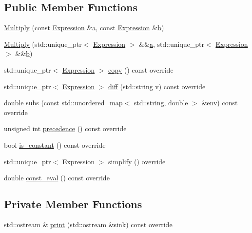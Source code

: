\subsection*{Public Member Functions}
\begin{DoxyCompactItemize}
\item 
\hyperlink{classsymcpp_1_1Multiply_abe8b88c2ac3ecd7deb275b1cb1f5dd9d}{Multiply} (const \hyperlink{classsymcpp_1_1Expression}{Expression} \&\hyperlink{classsymcpp_1_1Multiply_a8ed32ccb235cea51161dd0fd25ea130d}{a}, const \hyperlink{classsymcpp_1_1Expression}{Expression} \&\hyperlink{classsymcpp_1_1Multiply_a3d7a1b6e6e35585098b25f8b3a59e6ae}{b})
\item 
\hyperlink{classsymcpp_1_1Multiply_abefbdc2703e4c56207fe9aa987097fe6}{Multiply} (std\+::unique\+\_\+ptr$<$ \hyperlink{classsymcpp_1_1Expression}{Expression} $>$ \&\&\hyperlink{classsymcpp_1_1Multiply_a8ed32ccb235cea51161dd0fd25ea130d}{a}, std\+::unique\+\_\+ptr$<$ \hyperlink{classsymcpp_1_1Expression}{Expression} $>$ \&\&\hyperlink{classsymcpp_1_1Multiply_a3d7a1b6e6e35585098b25f8b3a59e6ae}{b})
\item 
std\+::unique\+\_\+ptr$<$ \hyperlink{classsymcpp_1_1Expression}{Expression} $>$ \hyperlink{classsymcpp_1_1Multiply_adcd57ab1c1a27eb10aeeb572cdd14e5e}{copy} () const override
\item 
std\+::unique\+\_\+ptr$<$ \hyperlink{classsymcpp_1_1Expression}{Expression} $>$ \hyperlink{classsymcpp_1_1Multiply_a835e55ada54a6c1eeb6d02ceeef83198}{diff} (std\+::string v) const override
\item 
double \hyperlink{classsymcpp_1_1Multiply_a83a9396b931cd5010630f48ecd1bc2a1}{subs} (const std\+::unordered\+\_\+map$<$ std\+::string, double $>$ \&env) const override
\item 
unsigned int \hyperlink{classsymcpp_1_1Multiply_afd9f779b82aa2d7a3be63e7b8b0e8eb1}{precedence} () const override
\item 
bool \hyperlink{classsymcpp_1_1Multiply_a771fc25f8bafd49600c31db11dd72256}{is\+\_\+constant} () const override
\item 
std\+::unique\+\_\+ptr$<$ \hyperlink{classsymcpp_1_1Expression}{Expression} $>$ \hyperlink{classsymcpp_1_1Multiply_aff728e2edaa447f154918079b4e35a7e}{simplify} () override
\item 
double \hyperlink{classsymcpp_1_1Multiply_a1d9b8023ab0bf35c011eb7f3ee8d4c32}{const\+\_\+eval} () const override
\end{DoxyCompactItemize}
\subsection*{Private Member Functions}
\begin{DoxyCompactItemize}
\item 
std\+::ostream \& \hyperlink{classsymcpp_1_1Multiply_a8d6dbfc85d0609f40d52c0fc853a06b5}{print} (std\+::ostream \&sink) const override
\end{DoxyCompactItemize}
